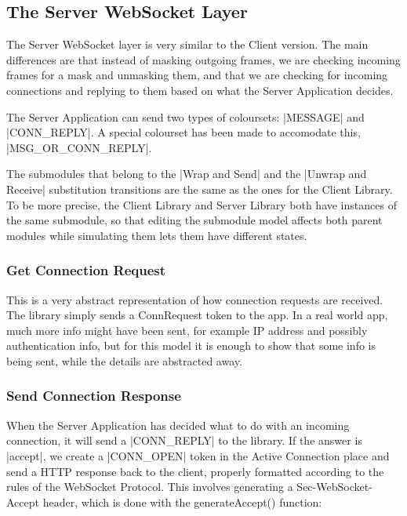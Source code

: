 \subsection{The Server WebSocket Layer}
	
	
	The Server WebSocket layer is very similar to the Client version. The main
	differences are that instead of masking outgoing frames, we are checking
	incoming frames for a mask and unmasking them, and that we are checking for
	incoming connections and replying to them based on what the Server Application
	decides.
	
	The Server Application can send two types of coloursets: |MESSAGE| and
	|CONN_REPLY|. A special colourset has been made to accomodate this,
	|MSG_OR_CONN_REPLY|. 
	
	The submodules that belong to the |Wrap and Send| and the
	|Unwrap and Receive| substitution transitions are the same as the ones for the Client Library. To
	be more precise, the Client Library and Server Library both have instances of
	the same submodule, so that editing the submodule model affects both parent
	modules while simulating them lets them have different states.
	
	\subsubsection{Get Connection Request}
		
		
		This is a very abstract representation of how connection requests are
		received. The library simply sends a ConnRequest token to the app. In a real
		world app, much more info might have been sent, for example IP address and
		possibly authentication info, but for this model it is enough to show that
		some info is being sent, while the details are abstracted away. 

	\subsubsection{Send Connection Response}
		
		
		When the Server Application has decided what to do with an incoming
		connection, it will send a |CONN_REPLY| to the library. If the
		answer is |accept|, we create a |CONN_OPEN| token in the
		Active Connection place and send a HTTP response back to the client, properly
		formatted according to the rules of the WebSocket Protocol. This involves
		generating a Sec-WebSocket-Accept header, which is done with the
		generateAccept() function:
		
